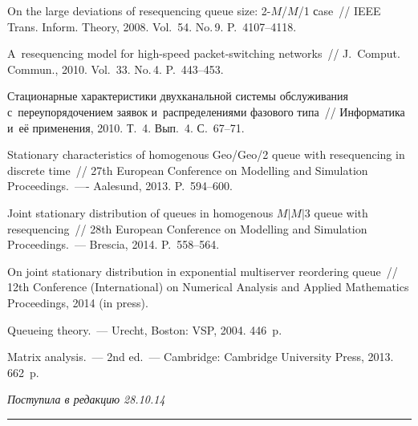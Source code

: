 \begin{multicols}{2}
{{\begin{thebibliography}{99}
On the large deviations of resequencing
queue size: 2-$M$/$M$/1 сase~// IEEE Trans. Inform. Theory, 2008.
Vol.~54. No.\,9. P.~4107--4118.

A~resequencing model for high-speed packet-switching networks~//
J.~Comput. Commun., 2010.
Vol.~33. No.\,4. P.~443--453.

 Стационарные характеристики двухканальной
системы обслуживания с~переупорядочением заявок и~распределениями
фазового типа~// Информатика и~её применения, 2010. Т.~4. Вып.~4.
С.~67--71.

Stationary characteristics of homogenous Geo/Geo/2
queue with resequencing in discrete time~//
27th European Conference on Modelling and
Simulation Proceedings.~---- Aalesund, 2013. P.~594--600.

Joint stationary distribution of queues in
homogenous $M\vert M\vert$3 queue with resequencing~//
28th European Conference on
Modelling and Simulation Proceedings.~--- Brescia, 2014. P.~558--564.

On joint stationary distribution in exponential
multiserver reordering queue~// 12th  Conference (International) on
Numerical Analysis and Applied Mathematics Proceedings, 2014 (in press).

Queueing theory.~--- Urecht, Boston: VSP, 2004. 446~p.

Matrix analysis.~--- 2nd ed.~--- Cambridge: Cambridge University Press, 2013.
662~p.
 \end{thebibliography}

 }
 }

\end{multicols}

\vspace*{-9pt}

\hfill{\small\textit{Поступила в редакцию 28.10.14}}


\vspace*{12pt}

\hrule

\vspace*{2pt}

